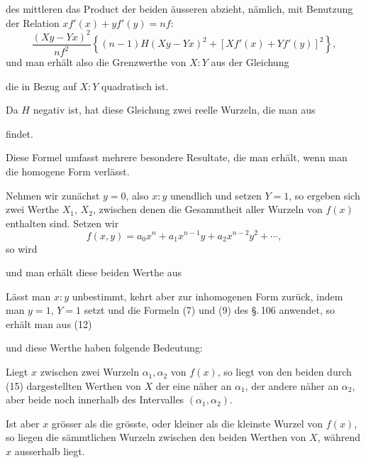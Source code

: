 des mittleren das Product der beiden äusseren abzieht, nämlich,
mit Benutzung der Relation $xf'(x) + yf'(y) = nf$:
\[
\frac{(Xy - Yx)^2}{nf^2}\left\{(n-1)H(Xy - Yx)^2 + [Xf'(x) + Yf'(y)]^2\right\},
\]
und man erhält also die Grenzwerthe von $X:Y$ aus der Gleichung


die in Bezug auf $X:Y$ quadratisch ist.

Da $H$ negativ ist, hat diese Gleichung zwei reelle Wurzeln,
die man aus


findet.

Diese Formel umfasst mehrere besondere Resultate, die man
erhält, wenn man die homogene Form verlässt.

Nehmen wir zunächst $y = 0$, also $x:y$ unendlich und
setzen $Y = 1$, so ergeben sich zwei Werthe $X_1$, $X_2$, zwischen
denen die Gesammtheit aller Wurzeln von $f(x)$ enthalten sind.
Setzen wir
\[
f(x, y) = a_0 x^n + a_1 x^{n-1} y + a_2 x^{n-2} y^2 + \cdots,
\]
so wird


und man erhält diese beiden Werthe aus


Lässt man $x:y$ unbestimmt, kehrt aber zur inhomogenen
Form zurück, indem man $y = 1$, $Y = 1$ setzt und die Formeln
(7) und (9) des \S.\,106 anwendet, so erhält man aus (12)


und diese Werthe haben folgende Bedeutung:

Liegt $x$ zwischen zwei Wurzeln $\alpha_1, \alpha_2$ von $f(x)$, so liegt von
den beiden durch (15) dargestellten Werthen von $X$ der eine
näher an $\alpha_1$, der andere näher an $\alpha_2$, aber beide noch innerhalb
des Intervalles $(\alpha_1, \alpha_2)$.

Ist aber $x$ grösser als die grösste, oder kleiner als die
kleinste Wurzel von $f(x)$, so liegen die sämmtlichen Wurzeln
zwischen den beiden Werthen von $X$, während $x$ ausserhalb liegt.
